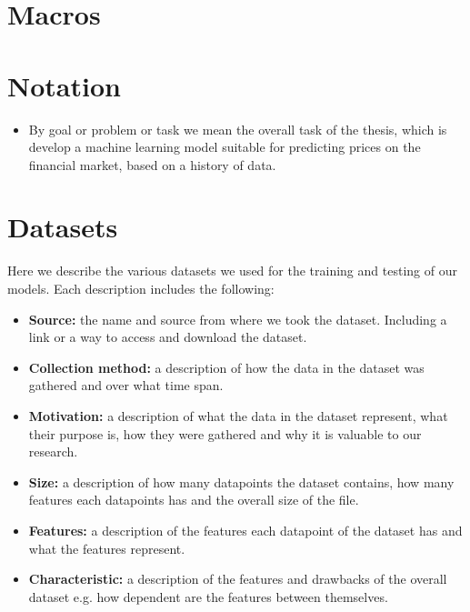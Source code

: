 \section{Macros}

\section{Notation}
\begin{itemize}
	\item By goal or problem or task we mean the overall task of the thesis, which is develop a machine learning model suitable for predicting prices on the financial market, based on a history of data.
\end{itemize}

\section{Datasets}
Here we describe the various datasets we used for the training and testing of our models. Each description includes the following:
\begin{itemize}
	\item \textbf{Source:} the name and source from where we took the dataset. Including a link or a way to access and download the dataset.
	\item \textbf{Collection method:} a description of how the data in the dataset was gathered and over what time span.
	\item \textbf{Motivation:} a description of what the data in the dataset represent, what their purpose is, how they were gathered and why it is valuable to our research.
	\item \textbf{Size:} a description of how many datapoints the dataset contains, how many features each datapoints has and the overall size of the file.
	\item \textbf{Features:} a description of the features each datapoint of the dataset has and what the features represent.
	\item \textbf{Characteristic:} a description of the features and drawbacks of the overall dataset e.g. how dependent are the features between themselves.
\end{itemize}
